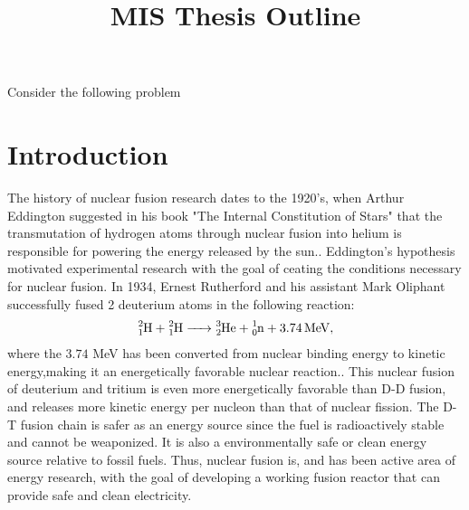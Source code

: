 \documentclass{article}
\title{ MIS Thesis Outline}
\begin{document}
\maketitle
\noindent
Consider the following problem
\section{Introduction}
The history of nuclear fusion research dates to the 1920's, when Arthur Eddington suggested in his book "The Internal Constitution of Stars" that the transmutation of hydrogen atoms through nuclear fusion into helium is responsible for powering the energy released by the sun.\cite{Eddington}. Eddington's hypothesis motivated experimental research with the goal of ceating the conditions necessary for nuclear fusion.
In 1934, Ernest Rutherford and his assistant Mark Oliphant successfully fused 2 deuterium atoms in the following reaction:
\begin{align*}
\ce{^2_1H + ^2_1H ->	^3_2He + ^1_0n + 3.74 MeV}, 
\end{align*}
where the $3.74$ MeV has been converted from nuclear binding energy to kinetic energy,making it an energetically favorable nuclear reaction.\cite{Oliphant_Rutherford}. %
This nuclear fusion of deuterium and tritium is even more energetically favorable than D-D fusion, and releases more kinetic energy per nucleon than that of nuclear fission. The D-T fusion chain is safer as an energy source since the fuel is radioactively stable and cannot be weaponized. It is also a environmentally safe or clean energy source relative to fossil fuels. Thus, nuclear fusion is, and has been active area of energy research, with the goal of developing a working fusion reactor that can provide safe and clean electricity.\\
\end{document}

